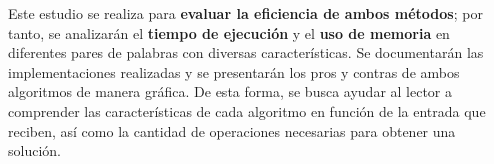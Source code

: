 Este estudio se realiza para \textbf{evaluar la eficiencia de ambos métodos}; por tanto, se analizarán el \textbf{tiempo de ejecución} y el \textbf{uso de memoria} en diferentes pares de palabras con diversas características. Se documentarán las implementaciones realizadas y se presentarán los pros y contras de ambos algoritmos de manera gráfica. De esta forma, se busca ayudar al lector a comprender las características de cada algoritmo en función de la entrada que reciben, así como la cantidad de operaciones necesarias para obtener una solución.
